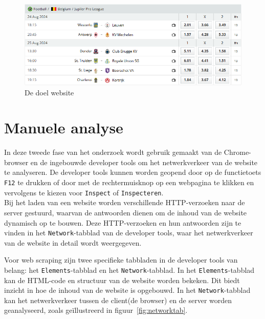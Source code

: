 \begin{figure}[h]
    \centering
    \includegraphics[width=\linewidth]{graphics/website2.png}
    \caption{De doel website}
    \label{fig:website1}
\end{figure}

\section{Manuele analyse}
\label{sec:analyse}
In deze tweede fase van het onderzoek wordt gebruik gemaakt van de Chrome-browser en de ingebouwde developer tools om het netwerkverkeer van de website te analyseren. De developer tools kunnen worden geopend door op de functietoets \texttt{F12} te drukken of door met de rechtermuisknop op een webpagina te klikken en vervolgens te kiezen voor \texttt{Inspect} of \texttt{Inspecteren}.
\\
Bij het laden van een website worden verschillende HTTP-verzoeken naar de server gestuurd, waarvan de antwoorden dienen om de inhoud van de website dynamisch op te bouwen. Deze HTTP-verzoeken en hun antwoorden zijn te vinden in het \texttt{Network}-tabblad van de developer tools, waar het netwerkverkeer van de website in detail wordt weergegeven.

Voor web scraping zijn twee specifieke tabbladen in de developer tools van belang: het \texttt{Elements}-tabblad en het \texttt{Network}-tabblad. In het \texttt{Elements}-tabblad kan de HTML-code en structuur van de website worden bekeken. Dit biedt inzicht in hoe de inhoud van de website is opgebouwd. In het \texttt{Network}-tabblad kan het netwerkverkeer tussen de client(de browser) en de server worden geanalyseerd, zoals geïllustreerd in figuur~\ref{fig:networktab}.


